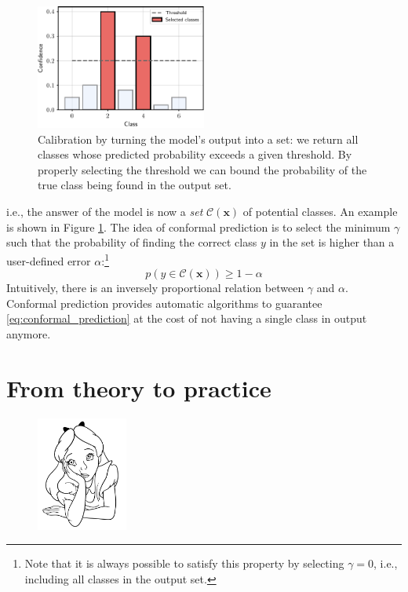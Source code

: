 \begin{figure}
    \centering
    \hspace{1em}\includegraphics[width=0.5\textwidth]{images/conformal_prediction.pdf}
    \caption{Calibration by turning the model's output into a set: we return all classes whose predicted probability exceeds a given threshold. By properly selecting the threshold we can bound the probability of the true class being found in the output set.}
    \label{fig:conformal_prediction}
\end{figure}

i.e., the answer of the model is now a \textit{set} $\mathcal{C}(\mathbf{x})$ of potential classes. An example is shown in Figure \ref{fig:conformal_prediction}. The idea of conformal prediction is to select the minimum $\gamma$ such that the probability of finding the correct class $y$ in the set is higher than a user-defined error $\alpha$:\footnote{Note that it is always possible to satisfy this property by selecting $\gamma = 0$, i.e., including all classes in the output set.}
%
\begin{equation}
p(y \in \mathcal{C}(\mathbf{x})) \ge 1 -\alpha
\label{eq:conformal_prediction}
\end{equation}
%
Intuitively, there is an inversely proportional relation between $\gamma$ and $\alpha$. Conformal prediction provides automatic algorithms to guarantee \eqref{eq:conformal_prediction} at the cost of not having a single class in output anymore.

\section*{From theory to practice}

\begin{figure}
\vspace{-3em}\includegraphics[width=3.0cm]{images/shutterstock_2075221579.jpg}
\vspace{-6em}
\end{figure}

